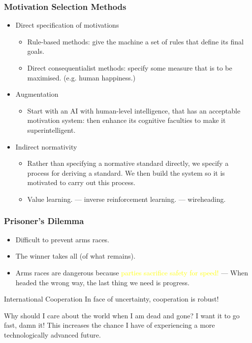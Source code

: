 \documentclass[UTF8,11pt,colorlinks,compress,openany]{beamer}%
\begin{document}
\begin{frame}\frametitle{Motivation Selection Methods}
\begin{itemize}
	\item Direct specification of motivations
		\begin{itemize}
			\item Rule-based methods: give the machine a set of rules that define its final goals.
			\item Direct consequentialist methods: specify some measure that is to be maximised. (e.g. human happiness.)
		\end{itemize}
	\item Augmentation
		\begin{itemize}
			\item Start with an AI with human-level intelligence, that has an acceptable motivation system: then enhance its cognitive faculties to make it superintelligent.
		\end{itemize}
	\item Indirect normativity
		\begin{itemize}
			\item Rather than specifying a normative standard directly, we specify a process for deriving a standard. We then build the system so it is motivated to carry out this process.
			\item Value learning. --- inverse reinforcement learning. --- wireheading.
		\end{itemize}
\end{itemize}
\end{frame}

\begin{frame}\frametitle{Prisoner's Dilemma}
\begin{itemize}
	\item Difficult to prevent arms races.
	\item The winner takes all (of what remains).
	\item Arms races are dangerous because \textcolor{yellow}{parties sacrifice safety for speed!} --- When headed the wrong way, the last thing we need is progress.
\end{itemize}
\begin{block}{International Cooperation}
In face of uncertainty, cooperation is robust!
\end{block}
Why should I care about the world when I am dead and gone? I want it to go fast, damn it! This increases the chance I have of experiencing a more technologically advanced future.
\end{frame}
\end{document}
